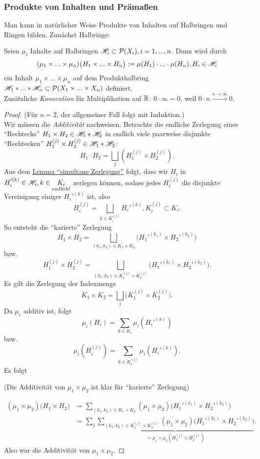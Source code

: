 \subsubsection{Produkte von Inhalten und Prämaßen}
Man kann in natürlicher Weise Produkte von Inhalten auf Halbringen und Ringen bilden. Zunächst Halbringe:
\begin{satz}
\begin{mdframed}
Seien $\mu_i$ Inhalte auf Halbringen $\mathscr{H}_i \subset \mathcal{P}(X_i), i=1,...,n$. Dann wird durch
$$
(\mu_1 \times ... \times \mu_n) \big(H_1 \times ... \times H_n \big) := \mu(H_1) \cdot ... \cdot \mu(H_n), H_i \in \mathscr{H}_i
$$
ein Inhalt $\mu_1 \times ... \times \mu_n$ auf dem Produkthalbring $\mathscr{H}_1 \ast ... \ast \mathscr{H}_n \subset \mathcal{P}(X_1 \times ... \times X_n)$ definiert. \\
Zusätzliche \emph{Konvention} für Multiplikation auf $\mathbb{R}$: $0 \cdot \infty = 0$, weil $ 0 \cdot n \xrightarrow{n \to \infty} 0$. 
\end{mdframed}
\begin{proof} (Für $n=2$, der allgemeiner Fall folgt mit Induktion.) \\
Wir müssen die \emph{Additivität} nachweisen. Betrachte die endliche Zerlegung eines ``Rechtecks'' $H_1 \times H_2 \in \mathscr{H}_1 \ast \mathscr{H}_2$ in endlich viele paarweise disjunkte ``Rechtecken'' $H_1^{(j)} \times H_2^{(j)} \in \mathscr{H}_1 \ast \mathscr{H}_2$:
$$
H_1 \cdot H_2 = \bigsqcup_{j} (H_1^{(j)} \times H_2^{(j)}).
$$
Aus dem \hyperref[lemmaA]{Lemma ``simultane Zerlegung''} folgt, dass wir $H_i$ in $H_i'^{(k)} \in \mathscr{H}_i, k \in \underset{\text{endlich!}}{K_i}$ zerlegen können, sodass jedes $H_i^{(j)}$  die disjunkte Vereinigung einiger $H_i'^{(k)}$ ist, also
$$
H_i^{(j)} = \bigsqcup_{k \in K_i^{(j)}} H_i'^{(k)}, K_i^{(j)}\subset K_i.
$$
So entsteht die ``karierte'' Zerlegung
$$
H_1 \times H_2 = \bigsqcup_{(k_1,k_2)\in K_1\times K_2} \Big (H_1'^{(k_1)} \times H_2'^{(k_2)} \Big)	
$$
bzw.
$$
H_1^{(j)} \times H_2^{(j)} = \bigsqcup_{(k_1,k_2)\in K_1^{(j)}\times K_2^{(j)}} \Big (H_1'^{(k_1)} \times H_2'^{(k_2)} \Big).
$$
Es gilt die Zerlegung der Indexmenge
$$
K_1 \times K_2 = \bigsqcup_j \Big( K_1^{(j)} \times K_2^{(j)} \Big).
$$
Da $\mu_i$ additiv ist, folgt
$$
\mu_i (H_i) = \sum_{k \in K_i} \mu_i (H_i'^{(k)})
$$
bzw. 
$$
\mu_i (H_i^{(j)}) = \sum_{k \in K_i^{(j)}} \mu_i (H_i'^{(k)}).
$$
Es folgt \begin{scriptsize}
(Die Additivität von $\mu_1 \times \mu_2$ ist klar für ``karierte'' Zerlegung)
\end{scriptsize}
\begin{equation*}
	\begin{split}
	(\mu_1 \times \mu_2) \big( H_1 \times H_2 \big) & = \sum_{(k_1,k_2) \in K_1 \times K_2} (\mu_1 \times \mu_2) \big(H_1'^{(k_1)} \times H_2'^{(k_2)} \big) \\
	& = \sum_j \underbrace{ \sum_{(k_1,k_2) \in K_1^{(j)} \times K_2^{(j)}} (\mu_1 \times \mu_2) \big(H_1'^{(k_1)} \times H_2'^{(k_2)} \big)}_{= \mu_1 \times \mu_2 (H_1^{(j)} \times H_2 ^{(j)})}.
	\end{split}
\end{equation*}
Also war die Additivität von $\mu_1 \times \mu_2$.
\end{proof}
\end{satz}

